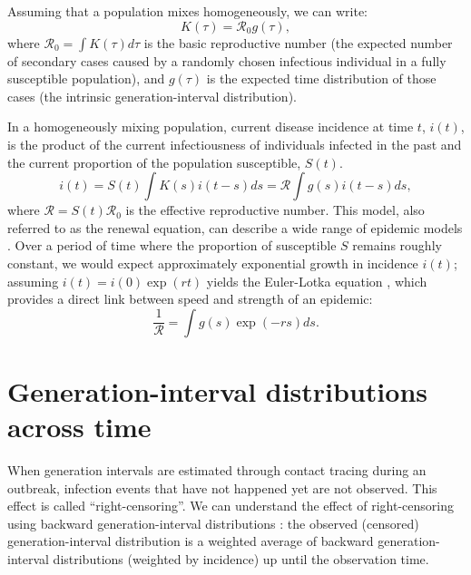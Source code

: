 \documentclass[12pt]{article}
\newcommand{\RR}{\ensuremath{{\mathcal R}}}
\begin{document}
Assuming that a population mixes homogeneously, we can write: 
\begin{equation}
K(\tau) = \RR_0 g(\tau),
\end{equation}
where $\RR_0 = \int K(\tau) d\tau$ is the basic reproductive number (the expected number of secondary cases caused by a randomly chosen infectious individual in a fully susceptible population), 
and $g(\tau)$ is the expected time distribution of those cases (the intrinsic generation-interval distribution).

In a homogeneously mixing population, current disease incidence at time $t$, $i(t)$, is the product of the current infectiousness of individuals infected in the past and the current proportion of the population susceptible, $S(t)$.
\begin{equation}
i(t) = S(t) \int K(s) i(t-s) ds = \RR \int g(s) i(t-s) ds,
\end{equation}
where $\RR = S(t) \RR_0$ is the effective reproductive number.
This model, also referred to as the renewal equation, can describe a wide range of epidemic models \citep{heesterbeek1996concept, diekmann2000mathematical, roberts2004modelling, aldis2005integral, wallinga2007generation, roberts2007model}.
Over a period of time where the proportion of susceptible $S$ remains roughly constant, we would expect approximately exponential growth in incidence $i(t)$; assuming $i(t) = i(0) \exp(r t)$ yields the Euler-Lotka equation \citep{lotka1907relation}, which provides a direct link between speed and strength of an epidemic:
\begin{equation}
\frac{1}{\RR} = \int g(s) \exp(-r s) ds.
\end{equation}

\section{Generation-interval distributions across time}

When generation intervals are estimated through contact tracing during an outbreak, infection events that have not happened yet are not observed. 
This effect is called ``right-censoring''.
We can understand the effect of right-censoring using backward generation-interval distributions \citep{tomba2010some, nishiura2010time, champredon2015intrinsic, britton2019estimation}:
the observed (censored) generation-interval distribution is a weighted average of backward generation-interval distributions (weighted by incidence) up until the observation time.
\end{document}
